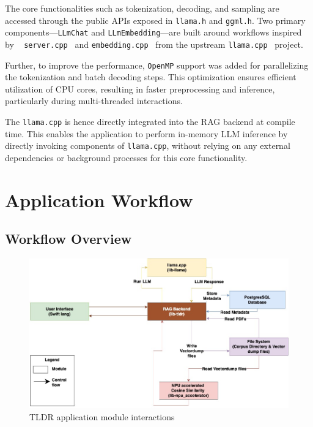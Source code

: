 The core functionalities such as tokenization, decoding, and sampling are accessed through the public APIs exposed in \texttt{llama.h} and \texttt{ggml.h}. Two primary components—\texttt{LLmChat} and \texttt{LLmEmbedding}—are built around workflows inspired by ~\cite{llama_simple} \texttt{server.cpp}~\cite{llama_server} and \texttt{embedding.cpp}~\cite{llama_embedding} from the upstream \texttt{llama.cpp}~\cite{llamacpp} project. 

Further, to improve the performance, \texttt{OpenMP} support was added for parallelizing the tokenization and batch decoding steps. This optimization ensures efficient utilization of CPU cores, resulting in faster preprocessing and inference, particularly during multi-threaded interactions.

The \texttt{llama.cpp} is hence directly integrated into the RAG backend at compile time. This enables the application to perform in-memory LLM inference by directly invoking components of \texttt{llama.cpp}, without relying on any external dependencies or background processes for this core functionality.
\section{Application Workflow}
\label{sec:AppWorkflow}

\subsection{Workflow Overview}
\label{subsec:AppDesignWorkflow-Overview}

\begin{figure}[H]
    \centering
    \includegraphics[width=1.0\linewidth]{images/tldr-app-module-interactions.jpg}
    \caption{TLDR application module interactions}
    \label{fig:tldrmodulesinteraction}
\end{figure}

